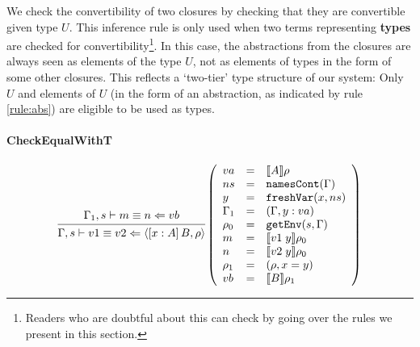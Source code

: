 \documentclass{article}
\theoremstyle{remark}
\begin{document}
We check the convertibility of two closures by checking that they are convertible given type $U$. This inference rule is only used when two terms representing \textbf{types} are checked for convertibility\footnote{Readers who are doubtful about this can check by going over the rules we present in this section.}. In this case, the abstractions from the closures are always seen as elements of the type $U$, not as elements of types in the form of some other closures. This reflects a `two-tier' type structure of our system: Only $U$ and elements of $U$ (in the form of an abstraction, as indicated by rule \ref{rule:abs}) are eligible to be used as types.

\paragraph{CheckEqualWithT}
\begin{align}
  \begin{prooftree}
    \hypo{\Gamma_1,s \vdash m \equiv n \Leftarrow vb}
    \infer1{\Gamma,s \vdash v1 \equiv v2 \Leftarrow \langle [x : A] \, B, \rho \rangle} 
  \end{prooftree}\left(\begin{array}{l l l}
                         va &= & \llbracket A \rrbracket \rho \\
                         ns &= & \texttt{namesCont}(\Gamma) \\
                         y &= & \texttt{freshVar}(x, ns) \\
                         \Gamma_1 &= & (\Gamma, y : va) \\
                         \rho_0 &= & \texttt{getEnv}(s, \Gamma) \\
                         m &= & \llbracket  v1 \; y \rrbracket \rho_0 \\
                         n &= & \llbracket v2 \; y \rrbracket \rho_0 \\
                         \rho_1 &= & (\rho, x = y) \\
                         vb &= & \llbracket B \rrbracket \rho_1 \\ 
                       \end{array}\right)
\end{align}
\end{document}
